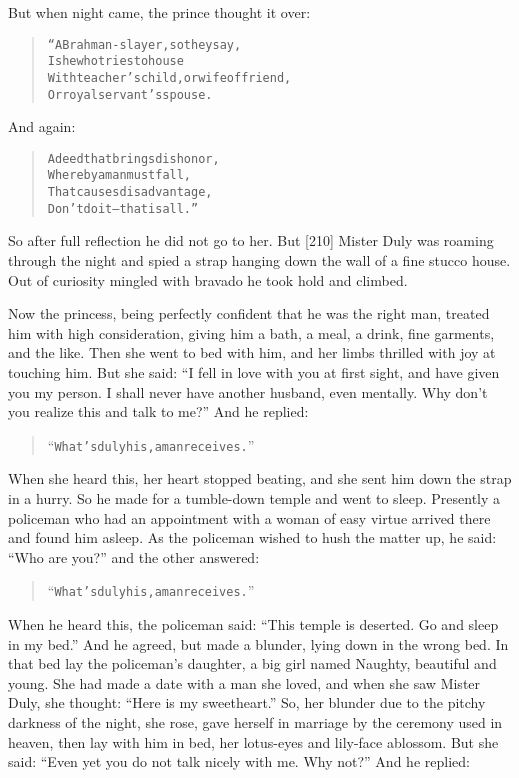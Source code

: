 \documentclass[article, twoside, 14pt]{memoir}
\renewenvironment{verbatim}{%
\begin{quote}%
\vskip -10pt%
\begin{alltt}\normalfont\large}{\end{alltt}%
\end{quote}%
\vskip -10pt
} %
\begin{document}
But when night came, the prince thought it over:

\begin{verbatim}
“A Brahman-slayer, so they say,
    Is he who tries to house
With teacher's child, or wife of friend,
    Or royal servant's spouse.
\end{verbatim}
And again:

\begin{verbatim}
A deed that brings dishonor,
    Whereby a man must fall,
That causes disadvantage,
    Don't do it--that is all.”
\end{verbatim}
So after full reflection he did not go to her. But [210] Mister
Duly was roaming through the night and spied a strap hanging down
the wall of a fine stucco house. Out of curiosity mingled with
bravado he took hold and climbed.

Now the princess, being perfectly confident that he was the right
man, treated him with high consideration, giving him a bath, a
meal, a drink, fine garments, and the like. Then she went to bed
with him, and her limbs thrilled with joy at touching him. But she
said:
``I fell in love with you at first sight, and have given you my person. I shall never have another husband, even mentally. Why don't you realize this and talk to me?''
And he replied:

\begin{verbatim}
“What's duly his, a man receives.”
\end{verbatim}
When she heard this, her heart stopped beating, and she sent him
down the strap in a hurry. So he made for a tumble-down temple and
went to sleep. Presently a policeman who had an appointment with a
woman of easy virtue arrived there and found him asleep. As the
policeman wished to hush the matter up, he said: ``Who are you?''
and the other answered:

\begin{verbatim}
“What's duly his, a man receives.”
\end{verbatim}
When he heard this, the policeman said:
``This temple is deserted. Go and sleep in my bed.'' And he agreed,
but made a blunder, lying down in the wrong bed. In that bed lay
the policeman's daughter, a big girl named Naughty, beautiful and
young. She had made a date with a man she loved, and when she saw
Mister Duly, she thought: ``Here is my sweetheart.'' So, her
blunder due to the pitchy darkness of the night, she rose, gave
herself in marriage by the ceremony used in heaven, then lay with
him in bed, her lotus-eyes and lily-face ablossom. But she said:
``Even yet you do not talk nicely with me. Why not?'' And he
replied:
\end{document}
